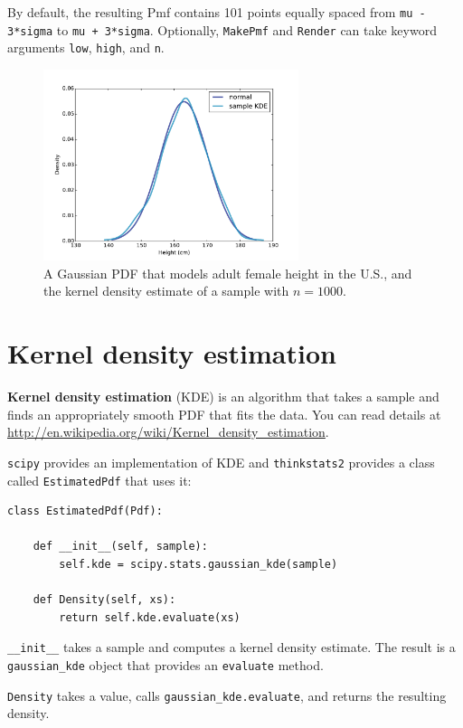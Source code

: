 \documentclass[12pt]{book}
\begin{document}
By default, the resulting Pmf contains 101 points equally spaced from
{\tt mu - 3*sigma} to {\tt mu + 3*sigma}.  Optionally, {\tt MakePmf}
and {\tt Render} can take keyword arguments {\tt low}, {\tt high},
and {\tt n}.

\begin{figure}
\centerline{\includegraphics[height=2.2in]{figs/pdf_example.pdf}}
\caption{A Gaussian PDF that models adult female height in the U.S.,
and the kernel density estimate of a sample with $n=1000$.}
\label{pdf_example}
\end{figure}


\section{Kernel density estimation} 

{\bf Kernel density estimation} (KDE) is an algorithm that takes
a sample and finds an appropriately smooth PDF that fits 
the data.  You can read details at
\url{http://en.wikipedia.org/wiki/Kernel_density_estimation}.

{\tt scipy} provides an implementation of KDE and {\tt thinkstats2}
provides a class called {\tt EstimatedPdf} that uses it:

\begin{verbatim}
class EstimatedPdf(Pdf):

    def __init__(self, sample):
        self.kde = scipy.stats.gaussian_kde(sample)

    def Density(self, xs):
        return self.kde.evaluate(xs)
\end{verbatim}

\verb"__init__" takes a sample
and computes a kernel density estimate.  The result is a
\verb"gaussian_kde" object that provides an {\tt evaluate}
method.

{\tt Density} takes a value, calls \verb"gaussian_kde.evaluate",
and returns the resulting density.
\end{document}
